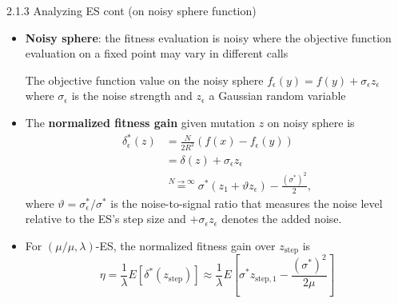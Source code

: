 \documentclass{beamer}
\begin{document}
\begin{frame}{2.1.3 Analyzing ES cont (on noisy sphere function)}
\begin{itemize}
    \item \textbf{Noisy sphere}: the fitness evaluation is noisy where the objective function evaluation on a fixed point may vary in different calls
    
    The objective function value on the noisy sphere $f_{\epsilon}(y) = f(y) + \sigma_{\epsilon} z_\epsilon$ where $\sigma_\epsilon$ is the noise strength and $z_\epsilon$ a Gaussian random variable
    \item The \textbf{normalized fitness gain} given mutation $z$ on noisy sphere is 
    \begin{align}
        \delta_\epsilon^* (z)
        &=  \frac{N}{2R^2}\left( f(x) - f_\epsilon(y)\right)  \nonumber\\ 
        & = \delta(z) + \sigma_\epsilon z_\epsilon\nonumber\\
        &\overset{N \rightarrow \infty}{=} \sigma^* (z_1 + \vartheta z_\epsilon ) - \frac{(\sigma^*)^2}{2}, \nonumber
    \end{align}
    where $\vartheta = \sigma_\epsilon^*/\sigma^*$ is the noise-to-signal ratio that measures the noise level relative to the ES's step size and $+\sigma_\epsilon z_\epsilon$ denotes the added noise.
    \item For $(\mu/\mu,\lambda)$-ES, the normalized fitness gain over $z_{\text{step}}$ is
    $$\eta = \frac{1}{\lambda}E[ \delta^*(z_{\text{step}})] \approx \frac{1}{\lambda} E \left[ \sigma^* z_{\text{step},1}  - \frac{(\sigma^*)^2}{2\mu}  \right]$$
\end{itemize}
\end{frame}

\end{document}
